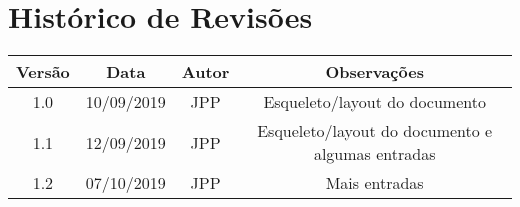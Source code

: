 \chapter*{Histórico de Revisões}

\begin{center}
    \begin{tabular}{|c|c|c|c|}
        \hline
        Versão & Data       & Autor & Observações                                      \\
        \hline
        1.0    & 10/09/2019 & JPP   & Esqueleto/layout do documento                    \\
        \hline
        1.1    & 12/09/2019 & JPP   & Esqueleto/layout do documento e algumas entradas \\
        \hline
        1.2    & 07/10/2019 & JPP   & Mais entradas                                    \\
        \hline
    \end{tabular}
\end{center}
